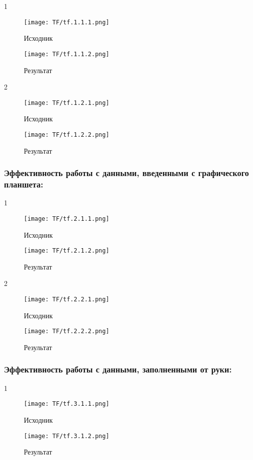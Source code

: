 \documentclass[a4paper, 12pt]{report}
\begin{document}
1
\begin{figure}[ht]
    \centering
    \texttt{[image: TF/tf.1.1.1.png]}
    \caption{Исходник}
    \label{fig:my_label}
\end{figure}
\begin{figure}[ht]
    \centering
    \texttt{[image: TF/tf.1.1.2.png]}
    \caption{Результат}
    \label{fig:my_label}
\end{figure}
\pagebreak

2
\begin{figure}[ht]
    \centering
    \texttt{[image: TF/tf.1.2.1.png]}
    \caption{Исходник}
    \label{fig:my_label}
\end{figure}
\begin{figure}[ht]
    \centering
    \texttt{[image: TF/tf.1.2.2.png]}
    \caption{Результат}
    \label{fig:my_label}
\end{figure}
\pagebreak

\subsubsection{Эффективность работы с данными, введенными с графического планшета:}
1
\begin{figure}[ht]
    \centering
    \texttt{[image: TF/tf.2.1.1.png]}
    \caption{Исходник}
    \label{fig:my_label}
\end{figure}
\begin{figure}[ht]
    \centering
    \texttt{[image: TF/tf.2.1.2.png]}
    \caption{Результат}
    \label{fig:my_label}
\end{figure}
\pagebreak

2
\begin{figure}[ht]
    \centering
    \texttt{[image: TF/tf.2.2.1.png]}
    \caption{Исходник}
    \label{fig:my_label}
\end{figure}
\begin{figure}[ht]
    \centering
    \texttt{[image: TF/tf.2.2.2.png]}
    \caption{Результат}
    \label{fig:my_label}
\end{figure}
\pagebreak

\subsubsection{Эффективность работы с данными, заполненными от руки:}
1
\begin{figure}[ht]
    \centering
    \texttt{[image: TF/tf.3.1.1.png]}
    \caption{Исходник}
    \label{fig:my_label}
\end{figure}
\begin{figure}[ht]
    \centering
    \texttt{[image: TF/tf.3.1.2.png]}
    \caption{Результат}
    \label{fig:my_label}
\end{figure}
\end{document}
